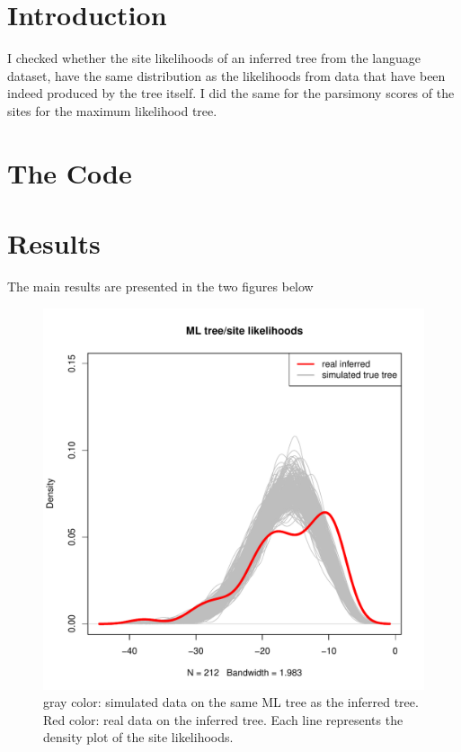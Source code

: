 \documentclass[12pt]{article}
\begin{document}
\section*{Introduction}
I checked whether the site likelihoods of an inferred tree from the
language dataset, have the same distribution as the likelihoods from data
that have been indeed produced by the tree itself. I did the same for
the parsimony scores of the sites for the maximum likelihood tree. 

\section*{The Code}


\section*{Results}
The main results are presented in the two figures below

\begin{figure}[htbp!]
  \centering
  \includegraphics[width=\textwidth]{siteMLValues.pdf}
  \caption{gray color: simulated data on the same ML tree as the inferred
    tree. Red color: real data on the inferred tree. Each line
    represents the density plot of the site likelihoods. }
\end{figure}
\end{document}

